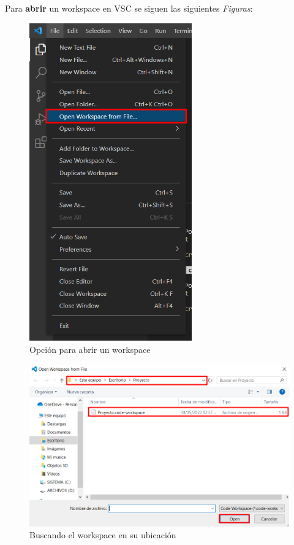 Para \textbf{abrir} un workspace en VSC se siguen las siguientes \textit{Figuras}:
\begin{figure}[H]
    \begin{center}
        \caption{Opción para abrir un workspace}
        \label{fig: 9}
        \includegraphics[width=7cm]{capturas/abriendo_w1.png}
    \end{center}
\end{figure}
\begin{figure}[H]
    \begin{center}
        \caption{Buscando el workspace en su ubicación}
        \label{fig: 10}
        \includegraphics[width=12cm]{capturas/abriendo_w2.png}
    \end{center}
\end{figure}

